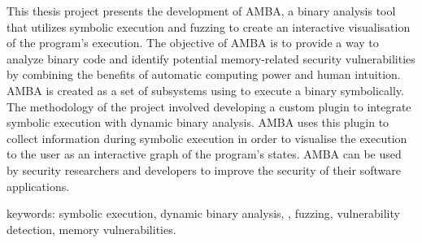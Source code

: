 
This thesis project presents the development of AMBA, a binary analysis
tool that utilizes symbolic execution and fuzzing to create an interactive
visualisation of the program's execution. The objective of AMBA is to provide
a way to analyze binary code and identify potential memory-related security
vulnerabilities by combining the benefits of automatic computing power and
human intuition. AMBA is created as a set of subsystems using \stoe{} to
execute a binary symbolically. The methodology of the project involved
developing a custom \stoe{} plugin to integrate symbolic execution with
dynamic binary analysis. AMBA uses this plugin to collect information during
symbolic execution in order to visualise the execution to the user as an
interactive graph of the program's states. AMBA can be used by security
researchers and developers to improve the security of their software
applications.


keywords: symbolic execution, dynamic binary analysis, \stoe{},
fuzzing, vulnerability detection, memory vulnerabilities.